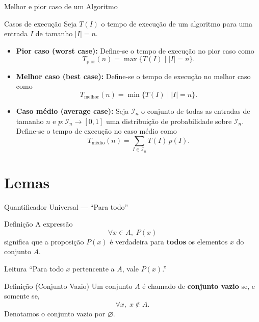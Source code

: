 \documentclass[9pt]{beamer}
\begin{document}
\begin{frame}{Melhor e pior caso de um Algoritmo}

\begin{block}{Casos de execução}
Seja \( T(I) \) o tempo de execução de um algoritmo para uma entrada \( I \) de tamanho \( |I| = n \).

\begin{itemize}
\item \textbf{Pior caso (worst case):}  
Define-se o tempo de execução no pior caso como
\[
T_{\text{pior}}(n) = \max \{ T(I) \mid |I| = n \}.
\]

\item \textbf{Melhor caso (best case):}  
Define-se o tempo de execução no melhor caso como
\[
T_{\text{melhor}}(n) = \min \{ T(I) \mid |I| = n \}.
\]

\item \textbf{Caso médio (average case):}  
Seja \( \mathcal{I}_n \) o conjunto de todas as entradas de tamanho \( n \) e
\( p : \mathcal{I}_n \to [0,1] \) uma distribuição de probabilidade sobre \( \mathcal{I}_n \).
Define-se o tempo de execução no caso médio como
\[
T_{\text{médio}}(n) = \sum_{I \in \mathcal{I}_n} T(I)\, p(I).
\]
\end{itemize}
\end{block}
\end{frame}
\section{Lemas}

\begin{frame}{Quantificador Universal — ``Para todo''}

\begin{block}{Definição}
A expressão
\[
\forall x \in A,\; P(x)
\]
significa que a proposição \(P(x)\) é verdadeira para \textbf{todos} os elementos
\(x\) do conjunto \(A\).
\end{block}

\vspace{0.4cm}

\begin{block}{Leitura}
``Para todo \(x\) pertencente a \(A\), vale \(P(x)\).''
\end{block}

\vspace{0.4cm}

\begin{block}{Definição (Conjunto Vazio)}
Um conjunto \( A \) é chamado de \textbf{conjunto vazio} se, e somente se,
\[
\forall x,\; x \notin A.
\]
Denotamos o conjunto vazio por \( \varnothing \).
\end{block}

\end{frame}
\end{document}
